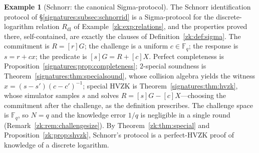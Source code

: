 \documentclass[11pt,a4paper]{article}
\theoremstyle{definition}
\newtheorem{example}[theorem]{Example}
\theoremstyle{remark}
\newcommand{\Fq}{\ensuremath{\mathbb{F}_{q}}}
\begin{document}
\begin{example}[Schnorr: the canonical Sigma-protocol]
\label{zk:exp:schnorr}
The Schnorr identification protocol of
\S\ref{signatures:subsec:schnorrid} is a Sigma-protocol for the
discrete-logarithm relation \(R_{\mathrm{dl}}\) of
Example~\ref{zk:exp:relations}, and the properties proved there,
self-contained, are exactly the clauses of
Definition~\ref{zk:def:sigma}. The commitment is \(R = [r]G\); the
challenge is a uniform \(c \in \Fq\); the response is
\(s = r + cx\); the predicate is \([s]G = R + [c]X\). Perfect
completeness is Proposition~\ref{signatures:prop:completeness};
\(2\)-special soundness is
Theorem~\ref{signatures:thm:specialsound}, whose collision algebra
yields the witness \(x = (s - s')(c - c')^{-1}\); special HVZK is
Theorem~\ref{signatures:thm:hvzk}, whose simulator samples \(s\) and
solves \(R = [s]G - [c]X\)---choosing the commitment after the
challenge, as the definition prescribes. The challenge space is
\(\Fq\), so \(N = q\) and the knowledge error \(1/q\) is negligible
in a single round (Remark~\ref{zk:rem:challengesize}). By
Theorem~\ref{zk:thm:special} and Proposition~\ref{zk:prop:shvzk},
Schnorr's protocol is a perfect-HVZK proof of knowledge of a
discrete logarithm.
\end{example}
\end{document}
